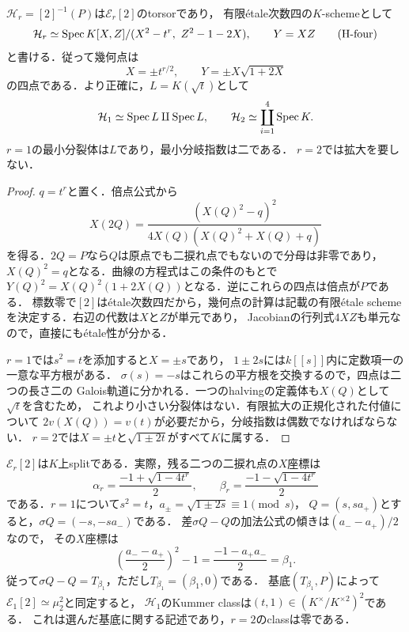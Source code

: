 \begin{proposition}
\label{prop:qa-boundary-all-halves}
$\mathcal H_r=[2]^{-1}(P)$は$\mathcal E_r[2]$のtorsorであり，
有限\'etale次数四の$K$-schemeとして
\[
 \mathcal H_r\simeq
 \operatorname{Spec} K[X,Z]/(X^2-t^r,\ Z^2-1-2X),\qquad Y=XZ
 \tag{H-four}\label{eq:qa-boundary-four-halves}
\]
と書ける．従って幾何点は
\[
 X=\pm t^{r/2},\qquad
 Y=\pm X\sqrt{1+2X}
\]
の四点である．より正確に，$L=K(\sqrt t)$として
\[
 \mathcal H_1\simeq\operatorname{Spec} L\amalg\operatorname{Spec} L,
 \qquad
 \mathcal H_2\simeq\coprod_{i=1}^4\operatorname{Spec} K.
\]
$r=1$の最小分裂体は$L$であり，最小分岐指数は二である．
$r=2$では拡大を要しない．
\end{proposition}
\begin{proof}
$q=t^r$と置く．倍点公式から
\[
 X(2Q)=\frac{(X(Q)^2-q)^2}
 {4X(Q)(X(Q)^2+X(Q)+q)}
\]
を得る．$2Q=P$なら$Q$は原点でも二捩れ点でもないので分母は非零であり，
$X(Q)^2=q$となる．曲線の方程式はこの条件のもとで
$Y(Q)^2=X(Q)^2(1+2X(Q))$となる．逆にこれらの四点は倍点が$P$である．
標数零で$[2]$は\'etale次数四だから，幾何点の計算は記載の有限\'etale
schemeを決定する．右辺の代数は$X$と$Z$が単元であり，
Jacobianの行列式$4XZ$も単元なので，直接にも\'etale性が分かる．

$r=1$では$s^2=t$を添加すると$X=\pm s$であり，
$1\pm2s$には$k[[s]]$内に定数項一の一意な平方根がある．
$\sigma(s)=-s$はこれらの平方根を交換するので，四点は二つの長さ二の
Galois軌道に分かれる．一つのhalvingの定義体も$X(Q)$として$\sqrt t$を含むため，
これより小さい分裂体はない．有限拡大の正規化された付値について
$2v(X(Q))=v(t)$が必要だから，分岐指数は偶数でなければならない．
$r=2$では$X=\pm t$と$\sqrt{1\pm2t}$がすべて$K$に属する．
\end{proof}

\begin{remark}
$\mathcal E_r[2]$は$K$上splitである．実際，残る二つの二捩れ点の$X$座標は
\[
 \alpha_r=\frac{-1+\sqrt{1-4t^r}}2,\qquad
 \beta_r=\frac{-1-\sqrt{1-4t^r}}2
\]
である．$r=1$について$s^2=t$，$a_\pm=\sqrt{1\pm2s}\equiv1\pmod s$，
$Q=(s,sa_+)$とすると，$\sigma Q=(-s,-sa_-)$である．
差$\sigma Q-Q$の加法公式の傾きは$(a_--a_+)/2$なので，
その$X$座標は
\[
 \left(\frac{a_--a_+}{2}\right)^2-1
   =\frac{-1-a_+a_-}{2}=\beta_1.
\]
従って$\sigma Q-Q=T_{\beta_1}$，ただし$T_{\beta_1}=(\beta_1,0)$である．
基底$(T_{\beta_1},P)$によって$\mathcal E_1[2]\simeq\mu_2^2$と同定すると，
$\mathcal H_1$のKummer classは$(t,1)\in(K^\times/K^{\times2})^2$である．
これは選んだ基底に関する記述であり，$r=2$のclassは零である．
\end{remark}

